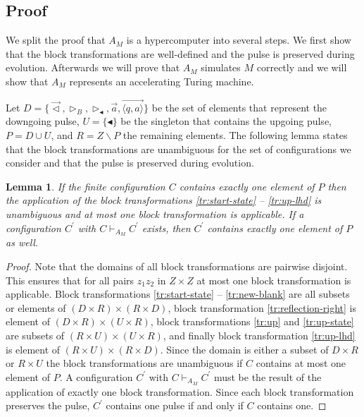 \documentclass[pre,showpacs,showkeys,preprint]{revtex4}
\newtheorem{lemma}{Lemma}
\theoremstyle{definition}
\begin{document}
\subsection{Proof}

We split the proof that $A_M$ is a hypercomputer into several steps.
We first show that the block transformations are well-defined and the pulse is preserved during evolution.
Afterwards we will prove that $A_M$ simulates $M$ correctly and we will show that $A_M$ represents an accelerating Turing machine.

Let $D = \{\overrightarrow{\lhd}, \rhd_B, \rhd_\blacktriangleleft, \overrightarrow{a}, \overrightarrow{\langle q,a \rangle} \}$ be the
set of elements that represent the downgoing pulse,  $U = \{\blacktriangleleft\}$ be the singleton that contains the upgoing pulse,
$P = D \cup U$, and
$R = Z \backslash P$ the remaining elements.
The following lemma states that the block transformations are unambiguous for the set of configurations we
consider and that the pulse is preserved during evolution.

\begin{lemma}
If the finite configuration $C$ contains exactly one element of $P$ then
the application of the block transformations \ref{tr:start-state} -- \ref{tr:up-lhd} is unambiguous and at most
one block transformation is applicable.
If a configuration $C^\prime$ with $C \vdash_{A_M} C^\prime$ exists, then $C^\prime$ contains exactly one
element of $P$ as well.
\end{lemma}
\begin{proof}
Note that the domains of all block transformations are pairwise disjoint.
This ensures that for all pairs $z_1z_2$ in $Z \times Z$ at most one block transformation is applicable.
Block transformations \ref{tr:start-state} -- \ref{tr:new-blank} are all subsets or elements of
$(D \times R) \times (R \times D)$,
block transformation \ref{tr:reflection-right} is element of $(D \times R) \times (U \times R)$,
block transformations \ref{tr:up} and \ref{tr:up-state} are subsets of
$(R \times U) \times (U \times R)$, and finally
block transformation \ref{tr:up-lhd} is element of $(R \times U) \times (R \times D)$.
Since the domain is either a subset of $D \times R$ or $R \times U$ the block transformations
are unambiguous if $C$ contains at most one element of $P$.
A configuration $C^\prime$ with $C \vdash_{A_M} C^\prime$ must be the result
of the application of exactly one block transformation.
Since each block transformation preserves the pulse, $C^\prime$ contains one pulse if and only if $C$ contains one.
\end{proof}
\end{document}
